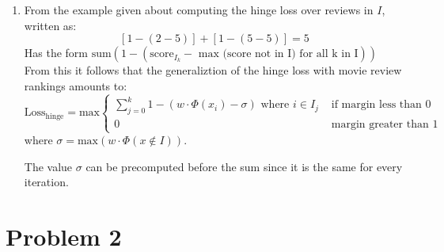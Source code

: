 \documentclass[12pt]{article}
\begin{document}
\begin{enumerate}[label=(\alph*)]
		\item From the example given about computing the hinge loss
			over reviews in \(I\), written as:
			\[
				[1 - (2 - 5)] + [1 - (5 - 5)] = 5
			\]
			Has the form \(\text{sum}(1 - (\text{score}_{I_k} - \text{ max (score not in I)} \text{ for all k in I}))\)
			From this it follows that the generaliztion of the hinge loss with movie
			review rankings amounts to:
			\[
				\text{Loss}_\text{hinge} =
					\text{max}
					\begin{cases}
						\sum_{j=0}^k 1 - (w \cdot \Phi(x_i) - \sigma) \text{ where } i \in I_j & \text{ if margin less than 0 } \\
						0 & \text{ margin greater than 1 } 
					\end{cases}
			\]
			where \(\sigma = \text{max}(w \cdot \Phi(x\notin I))\).

			The value \(\sigma\) can be precomputed before the sum since it is the same for every iteration.

	\end{enumerate}

	\section*{Problem 2}
\end{document}
